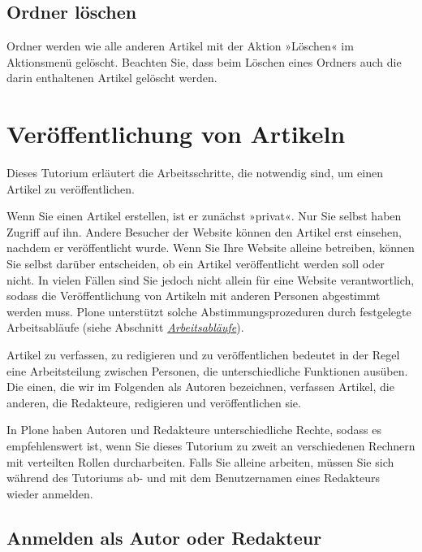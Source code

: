 \documentclass[a4paper,12pt,ngerman]{manual}
\begin{document}
\subsection{Ordner löschen}

Ordner werden wie alle anderen Artikel mit der Aktion »Löschen« im
Aktionsmenü gelöscht. Beachten Sie, dass beim Löschen eines Ordners auch die
darin enthaltenen Artikel gelöscht werden.

\resetcurrentobjects
\hypertarget{--doc-tutorien/redakteur}{}

\hypertarget{sec-veroff-von-artik}{}\section{Veröffentlichung von Artikeln}

Dieses Tutorium erläutert die Arbeitsschritte, die notwendig sind, um einen
Artikel zu veröffentlichen.

Wenn Sie einen Artikel erstellen, ist er zunächst »privat«. Nur Sie selbst
haben Zugriff auf ihn. Andere Besucher der Website können den Artikel erst
einsehen, nachdem er veröffentlicht wurde. Wenn Sie Ihre Website
alleine betreiben, können Sie selbst darüber entscheiden, ob ein Artikel
veröffentlicht werden soll oder nicht. In vielen Fällen sind Sie jedoch
nicht allein für eine Website verantwortlich, sodass die Veröffentlichung von
Artikeln mit anderen Personen abgestimmt werden muss. Plone unterstützt solche
Abstimmungsprozeduren durch festgelegte Arbeitsabläufe (siehe
Abschnitt \hyperlink{sec-workflow}{\emph{Arbeitsabläufe}}).

Artikel zu verfassen, zu redigieren und zu veröffentlichen bedeutet in der
Regel eine Arbeitsteilung zwischen Personen, die unterschiedliche
Funktionen ausüben. Die einen, die wir im Folgenden als Autoren
bezeichnen, verfassen Artikel, die anderen, die Redakteure, redigieren
und veröffentlichen sie.

In Plone haben Autoren und Redakteure unterschiedliche Rechte, sodass es
empfehlenswert ist, wenn Sie dieses Tutorium zu zweit an verschiedenen
Rechnern mit verteilten Rollen durcharbeiten. Falls Sie alleine arbeiten,
müssen Sie sich während des Tutoriums ab- und mit dem Benutzernamen eines
Redakteurs wieder anmelden.


\hypertarget{sec-veroff-von-artik-1}{}\subsection{Anmelden als Autor oder Redakteur}
\end{document}
